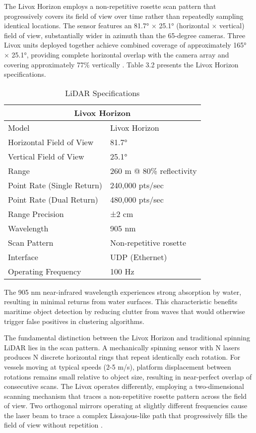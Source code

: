 \documentclass{erauthesis}
\begin{document}
The Livox Horizon employs a non-repetitive rosette scan pattern that progressively covers its field of view over time rather than repeatedly sampling identical locations.
The sensor features an 81.7° × 25.1° (horizontal × vertical) field of view, substantially wider in azimuth than the 65-degree cameras.
Three Livox units deployed together achieve combined coverage of approximately 165° × 25.1°, providing complete horizontal overlap with the camera array and covering approximately 77\% vertically \cite{thompson2023}.
Table 3.2 presents the Livox Horizon specifications.

\begin{table}[h]
\centering
\caption{LiDAR Specifications}
\begin{tabular}{ll}
\hline
\multicolumn{2}{c}{Livox Horizon}\\
\hline
\hline
Model & Livox Horizon \\
Horizontal Field of View & 81.7° \\
Vertical Field of View & 25.1° \\
Range & 260 m @ 80\% reflectivity \\
Point Rate (Single Return) & 240,000 pts/sec \\
Point Rate (Dual Return) & 480,000 pts/sec \\
Range Precision & ±2 cm \\
Wavelength & 905 nm \\
Scan Pattern & Non-repetitive rosette \\
Interface & UDP (Ethernet) \\
Operating Frequency & 100 Hz \\
\hline
\end{tabular}
\label{tab:livox_horizon_specs}
\end{table}

The 905 nm near-infrared wavelength experiences strong absorption by water, resulting in minimal returns from water surfaces.
This characteristic benefits maritime object detection by reducing clutter from waves that would otherwise trigger false positives in clustering algorithms.

The fundamental distinction between the Livox Horizon and traditional spinning \ac{LiDAR} lies in the scan pattern.
A mechanically spinning sensor with N lasers produces N discrete horizontal rings that repeat identically each rotation.
For vessels moving at typical speeds (2-5 m/s), platform displacement between rotations remains small relative to object size, resulting in near-perfect overlap of consecutive scans.
The Livox operates differently, employing a two-dimensional scanning mechanism that traces a non-repetitive rosette pattern across the field of view.
Two orthogonal mirrors operating at slightly different frequencies cause the laser beam to trace a complex Lissajous-like path that progressively fills the field of view without repetition \cite{thompson2023}.
\end{document}
